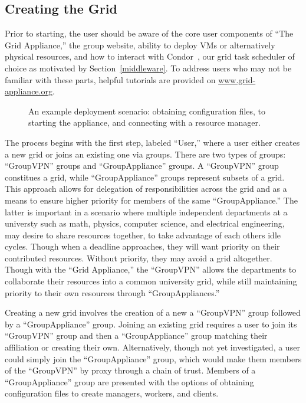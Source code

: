 \documentclass[conference]{IEEEtran}
\begin{document}
\subsection{Creating the Grid}

Prior to starting, the user should be aware of the core user components of
``The Grid Appliance,'' the group website, ability to deploy VMs or
alternatively physical resources, and how to interact with
Condor~\cite{condor0}, our grid task scheduler of choice as motivated by
Section~\ref{middleware}.  To address users who may not be familiar with these
parts, helpful tutorials are provided on \url{www.grid-appliance.org}.  

\begin{figure}[ht]
\centering
{}
\caption{An example deployment scenario:  obtaining configuration files, to
starting the appliance, and connecting with a resource manager.}
\label{fig:system}
\end{figure}

The process begins with the first step, labeled ``User,'' where a user either
creates a new grid or joins an existing one via groups.  There are two types of
groups: ``GroupVPN'' groups and ``GroupAppliance'' groups. A ``GroupVPN'' group
constitues a grid, while ``GroupAppliance'' groups represent subsets of a grid.
This approach allows for delegation of responsibilities across the grid and as
a means to ensure higher priority for members of the same ``GroupAppliance.''
The latter is important in a scenario where multiple independent departments at
a universty such as math, physics, computer science, and electrical
engineering, may desire to share resources together, to take advantage of each
others idle cycles.  Though when a deadline approaches, they will want priority
on their contributed resources.  Without priority, they may avoid a grid
altogether.  Though with the ``Grid Appliance,'' the ``GroupVPN'' allows the
departments to collaborate their resources into a common university grid, while
still maintaining priority to their own resources through ``GroupAppliances.''

Creating a new grid involves the creation of a new a ``GroupVPN'' group
followed by a ``GroupAppliance'' group.  Joining an existing grid requires a
user to join its ``GroupVPN'' group and then a ``GroupAppliance'' group
matching their affiliation or creating their own.  Alternatively, though not
yet investigated, a user could simply join the ``GroupAppliance'' group, which
would make them members of the ``GroupVPN'' by proxy through a chain of trust.
Members of a ``GroupAppliance'' group are presented with the options of
obtaining configuration files to create managers, workers, and clients.
\end{document}
